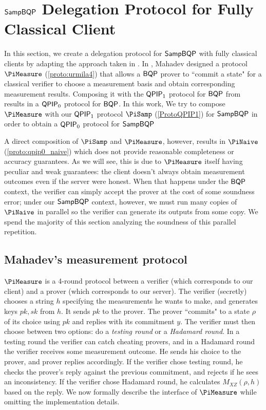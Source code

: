 \section{$\operatorname{\mathsf{SampBQP}}$ Delegation Protocol for Fully Classical Client}
\label{sec:qpip0_all}


In this section, we create a delegation protocol for $\operatorname{\mathsf{SampBQP}}$ with fully classical clients by adapting the approach taken in \cite{FOCS:Mahadev18a}. In \cite{FOCS:Mahadev18a}, 
Mahadev designed a protocol $\PiMeasure$ (\cref{proto:urmila4}) that allows a $\operatorname{\mathsf{BQP}}$ prover to ``commit a state" for a classical verifier to choose a measurement basis and obtain corresponding measurement results.
Composing it with the $\operatorname{\mathsf{QPIP}}_1$ protocol for $\operatorname{\mathsf{BQP}}$ from \cite{mf16} results in a $\operatorname{\mathsf{QPIP}}_0$ protocol for $\operatorname{\mathsf{BQP}}$.
In this work, We try to compose $\PiMeasure$ with our $\operatorname{\mathsf{QPIP}}_1$ protocol $\PiSamp$ (\cref{ProtoQPIP1}) for $\operatorname{\mathsf{SampBQP}}$ in order to obtain a $\operatorname{\mathsf{QPIP}}_0$ protocol for $\operatorname{\mathsf{SampBQP}}$ 



A direct composition of $\PiSamp$ and $\PiMeasure$, however, results in $\PiNaive$ (\cref{proto:qpip0_naive}) which does not provide reasonable completeness or accuracy guarantees.
As we will see, this is due to $\PiMeasure$ itself having peculiar and weak guarantees:
the client doesn't always obtain measurement outcomes even if the server were honest.
When that happens under the $\operatorname{\mathsf{BQP}}$ context, the verifier can simply accept the prover at the cost of some soundness error;
under our $\operatorname{\mathsf{SampBQP}}$ context, however, we must run many copies of $\PiNaive$ in parallel so the verifier can generate its outputs from some copy.
We spend the majority of this section analyzing the soundness of this parallel repetition.

\subsection{Mahadev's measurement protocol}\label{sec:urmila4}

$\PiMeasure$ is a 4-round protocol between a verifier (which corresponds to our client) and a prover (which corresponds to our server).
The verifier (secretly) chooses a string $h$ specifying the measurements he wants to make, and generates keys $pk, sk$ from $h$. It sends $pk$ to the prover. The prover ``commits" to a state $\rho$ of its choice using $pk$ and replies with its commitment $y$.
The verifier must then choose between two options: do a \emph{testing round} or a \emph{Hadamard round}.
In a testing round the verifier can catch cheating provers,
and in a Hadamard round the verifier receives some measurement outcome.
He sends his choice to the prover, and prover replies accordingly. If the verifier chose testing round, he checks the prover's reply against the previous commitment, and rejects if he sees an inconsistency. If the verifier chose Hadamard round, he calculates $M_{XZ}(\rho, h)$ based on the reply.
We now formally describe the interface of $\PiMeasure$ while omitting the implementation details.

